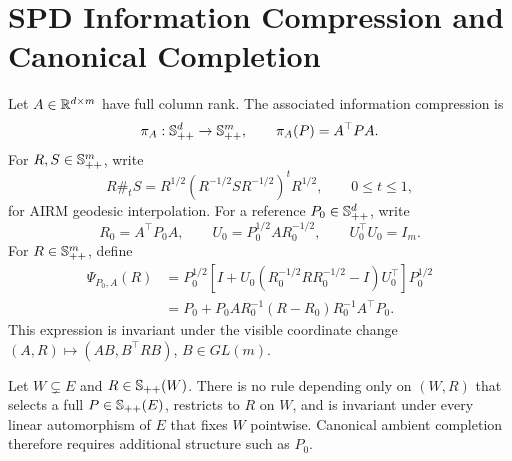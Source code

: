 \section{SPD Information Compression and Canonical Completion}
\label{sec:spd-realization}

Let \(A\in\mathbb R^{d\times m}\) have full column rank.  The associated information
compression is
\begin{equation}
  \pi_A:\mathbb S_{++}^d\to\mathbb S_{++}^m,
  \qquad
  \pi_A(P)=A^\top P A.
  \label{eq:spd-compression}
\end{equation}
For \(R,S\in\mathbb S_{++}^m\), write
\begin{equation}
  R\#_tS
  =R^{1/2}(R^{-1/2}SR^{-1/2})^tR^{1/2},
  \qquad 0\le t\le1,
  \label{eq:airm-geodesic}
\end{equation}
for AIRM geodesic interpolation.
For a reference \(P_0\in\mathbb S_{++}^d\), write
\[
  R_0=A^\top P_0A,
  \qquad
  U_0=P_0^{1/2}AR_0^{-1/2},
  \qquad U_0^\top U_0=I_m.
\]
For \(R\in\mathbb S_{++}^m\), define
\begin{align}
  \Psi_{P_0,A}(R)
  &=P_0^{1/2}
  \left[I+U_0(R_0^{-1/2}RR_0^{-1/2}-I)U_0^\top\right]
  P_0^{1/2}
  \nonumber\\
  &=P_0+P_0AR_0^{-1}(R-R_0)R_0^{-1}A^\top P_0.
  \label{eq:canonical-completion}
\end{align}
This expression is invariant under the visible coordinate change
\((A,R)\mapsto(AB,B^\top RB)\), \(B\in GL(m)\).

\begin{proposition}
\label{prop:reference-necessary}
Let \(W\subsetneq E\) and \(R\in\mathbb S_{++}(W)\).  There is no rule depending only
on \((W,R)\) that selects a full \(P\in\mathbb S_{++}(E)\), restricts to \(R\) on
\(W\), and is invariant under every linear automorphism of \(E\) that fixes
\(W\) pointwise.  Canonical ambient completion therefore requires additional
structure such as \(P_0\).
\end{proposition}

